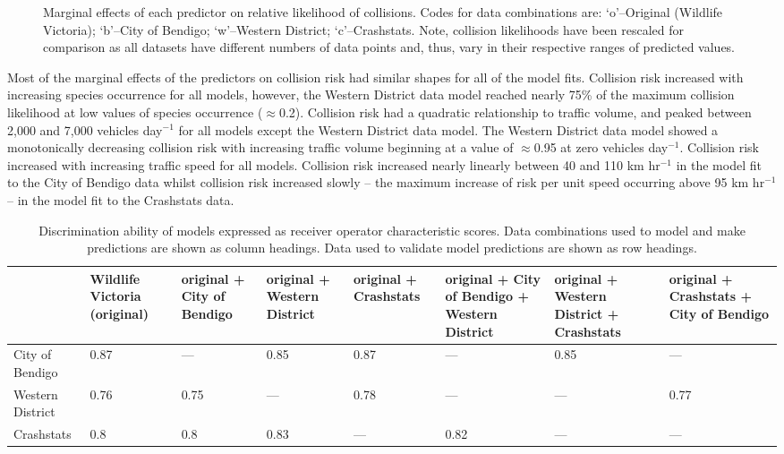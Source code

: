 \begin{figure*}[!t]
  \centering
  \hfill
  \hfill
  \caption[Marginal effects of predictor variables on relative likelihood of collision using independent datasets to train models]{Marginal effects of each predictor on relative likelihood of collisions. Codes for data combinations are: `o'--Original (Wildlife Victoria); `b'--City of Bendigo; `w'--Western District; `c'--Crashstats. Note, collision likelihoods have been rescaled for comparison as all datasets have different numbers of data points and, thus, vary in their respective ranges of predicted values.}
  \label{val_effects}
\end{figure*}

Most of the marginal effects of the predictors on collision risk had similar shapes for all of the model fits. Collision risk increased with increasing species occurrence for all models, however, the Western District data model reached nearly 75\% of the maximum collision likelihood at low values of species occurrence ($\approx$0.2). Collision risk had a quadratic relationship to traffic volume, and peaked between 2,000 and 7,000 vehicles day$^{-1}$ for all models except the Western District data model. The Western District data model showed a monotonically decreasing collision risk with increasing traffic volume beginning at a value of $\approx$0.95 at zero vehicles day$^{-1}$. Collision risk increased with increasing traffic speed for all models. Collision risk increased nearly linearly between 40 and 110 km hr$^{-1}$ in the model fit to the City of Bendigo data whilst collision risk increased slowly -- the maximum increase of risk per unit speed occurring above 95 km hr$^{-1}$ -- in the model fit to the Crashstats data.

\begin{table}[!t]
\caption[Discrimination ability of models using all combinations of independent data]{Discrimination ability of models expressed as receiver operator characteristic scores. Data combinations used to model and make predictions are shown as column headings. Data used to validate model predictions are shown as row headings.}
\centering
\begin{tabularx}{0.9\textwidth}{YYYYYYYY} \toprule
	& Wildlife Victoria
(original) & original + City of Bendigo & original + Western District & original + Crashstats & original + City of Bendigo + Western District & original + Western District + Crashstats & original + Crashstats + City of Bendigo \\ 
  \midrule
City of Bendigo & 0.87 & --- & 0.85 & 0.87 & --- & 0.85 & --- \\ 
Western District & 0.76 & 0.75 & --- & 0.78 & --- & --- & 0.77 \\ 
Crashstats & 0.8 & 0.8 & 0.83 & --- & 0.82 & --- & --- \\
\bottomrule
\end{tabularx}
\label{val_glm_roc}
\end{table}

